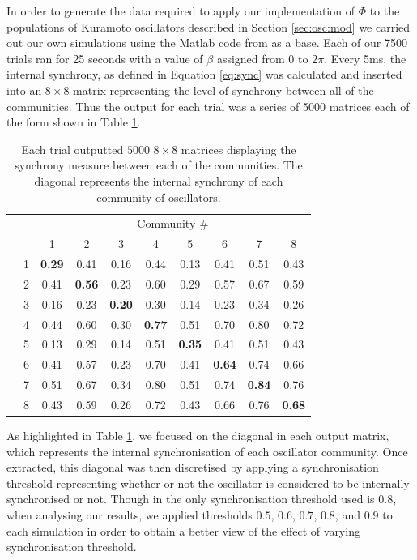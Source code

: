 \documentclass[a4paper,11pt]{article}
\begin{document}
In order to generate the data required to apply our implementation of $\Phi$ to the populations of Kuramoto oscillators described in Section \ref{sec:osc:mod} we carried out our own simulations using the Matlab code from \cite{Shanahan2010} as a base. Each of our 7500 trials ran for 25 seconds with a value of $\beta$ assigned from $0$ to $2\pi$. Every 5ms, the internal synchrony, as defined in Equation \ref{eq:sync} was calculated and inserted into an $8 \times 8$ matrix representing the level of synchrony between all of the communities. Thus the output for each trial was a series of 5000 matrices each of the form shown in Table \ref{tab:mat}.


\begin{table}[ht]
\centering

\begin{tabular}{c l | c c c c c c c c}

& & \multicolumn{8}{c}{Community \#} \\ [2mm]
& & 1 & 2 & 3 & 4 & 5 & 6 & 7 & 8 \\
\hline
\parbox[t]{2mm}{}
& 1 & \textbf{0.29} & 0.41 & 0.16 & 0.44 & 0.13 & 0.41 & 0.51 & 0.43 \\
& 2 & 0.41 & \textbf{0.56} & 0.23 & 0.60 & 0.29 & 0.57 & 0.67 & 0.59 \\
& 3 & 0.16 & 0.23 & \textbf{0.20} & 0.30 & 0.14 & 0.23 & 0.34 & 0.26 \\
& 4 & 0.44 & 0.60 & 0.30 & \textbf{0.77} & 0.51 & 0.70 & 0.80 & 0.72 \\
& 5 & 0.13 & 0.29 & 0.14 & 0.51 & \textbf{0.35} & 0.41 & 0.51 & 0.43 \\
& 6 & 0.41 & 0.57 & 0.23 & 0.70 & 0.41 & \textbf{0.64} & 0.74 & 0.66 \\
& 7 & 0.51 & 0.67 & 0.34 & 0.80 & 0.51 & 0.74 & \textbf{0.84} & 0.76 \\
& 8 & 0.43 & 0.59 & 0.26 & 0.72 & 0.43 & 0.66 & 0.76 & \textbf{0.68} \\
\end{tabular}
\caption{Each trial outputted $5000$ $8 \times 8$ matrices displaying the synchrony measure between each of the communities. The diagonal represents the internal synchrony of each community of oscillators. \label{tab:mat}}
\end{table}

As highlighted in Table \ref{tab:mat}, we focused on the diagonal in each output matrix, which represents the internal synchronisation of each oscillator community. Once extracted, this diagonal was then discretised by applying a synchronisation threshold representing whether or not the oscillator is considered to be internally synchronised or not. Though in \cite{Shanahan2010} the only synchronisation threshold used is $0.8$, when analysing our results, we applied thresholds $0.5$, $0.6$, $0.7$, $0.8$, and $0.9$ to each simulation in order to obtain a better view of the effect of varying synchronisation threshold.
\end{document}
